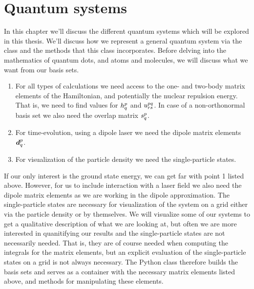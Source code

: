 \chapter{Quantum systems}
    In this chapter we'll discuss the different quantum systems which will be
    explored in this thesis.
    We'll discuss how we represent a general quantum system via the class
     and the methods that this class incorporates.
    Before delving into the mathematics of quantum dots, and atoms and
    molecules, we will discuss what we want from our basis sets.
    \begin{enumerate}
        \item For all types of calculations we need access to the one- and
            two-body matrix elements of the Hamiltonian, and potentially the
            nuclear repulsion energy.
            That is, we need to find values for $h^{p}_{q}$ and
            $u^{pq}_{rs}$.
            In case of a non-orthonormal basis set we also need the overlap
            matrix $s^{p}_{q}$.
        \item For time-evolution, using a dipole laser we need the dipole matrix
            elements $\boldsymbol{d}^{p}_{q}$.
        \item For visualization of the particle density we need the
            single-particle states.
    \end{enumerate}
    If our only interest is the ground state energy, we can get far with point 1
    listed above.
    However, for us to include interaction with a laser field we also need the
    dipole matrix elements as we are working in the dipole approximation.
    The single-particle states are necessary for visualization of the system on
    a grid either via the particle density or by themselves.
    We will visualize some of our systems to get a qualitative description of
    what we are looking at, but often we are more interested in quanitifying our
    results and the single-particle states are not necessarily needed.
    That is, they are of course needed when computing the integrals for the
    matrix elements, but an explicit evaluation of the single-particle states on
    a grid is not always necessary.
    The Python class  therefore builds the basis sets and
    serves as a container with the necessary matrix elements listed above, and
    methods for manipulating these elements.


